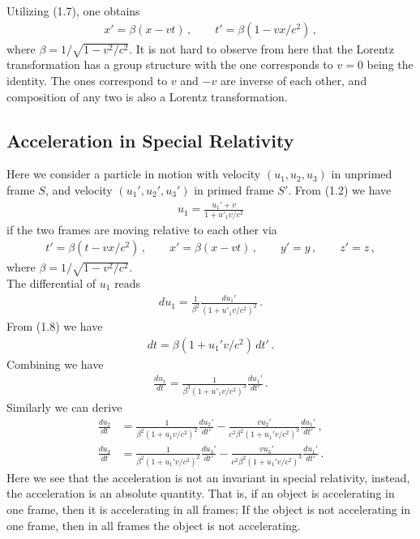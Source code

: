 \documentclass[11pt, onesided]{book}
\theoremstyle{break}
\theoremstyle{break}
\begin{document}
Utilizing (1.7), one obtains
\begin{align}
 x' = \beta (x - vt) \,,\qquad t' = \beta (1- vx/c^2)\,,
\end{align}
where $\beta = 1/\sqrt{1 - v^2 / c^2}$. It is not hard to observe from here that the Lorentz transformation has a group structure with the one corresponds to $v = 0$ being the identity. The ones correspond to $v$ and $-v$ are inverse of each other, and composition of any two is also a Lorentz transformation. \\

\subsection{Acceleration in Special Relativity}
Here we consider a particle in motion with velocity $(u_1,u_2,u_3)$ in unprimed frame $S$, and velocity $(u_1', u_2', u_3')$ in primed frame $S'$. From (1.2) we have
\begin{align*}
u_1 = \frac{u_1' + v}{1+ u'_1 v/c^2}
\end{align*}
if the two frames are moving relative to each other via
\begin{align*}
t' = \beta(t-vx/c^2)\,, \qquad x' = \beta (x- vt)\,, \qquad y'=y\,, \qquad z'=z\,,
\end{align*}
where $\beta = 1/\sqrt{1-v^2/c^2}$.\\

The differential of $u_1$ reads
\begin{align*}
du_1 = \frac{1}{\beta^2} \frac{du_1'}{(1+u'_1 v/c^2)^2}\,.
\end{align*}
From (1.8) we have
\begin{align*}
dt = \beta (1 + u_1'v/c^2)\, dt'\,.
\end{align*}
Combining we have
\begin{align*}
\frac{du_1}{dt} = \frac{1}{\beta^3(1+ u'_1 v/c^2)^3}\frac{du_1'}{dt'}\,.
\end{align*}
Similarly we can derive
\begin{align*}
\frac{du_2}{dt} &= \frac{1}{\beta^2(1+u_1v/c^2)^2} \frac{du_2'}{dt'} - \frac{vu_2'}{c^2 \beta^2 ( 1+ u_1'v/c^2)^3}\frac{du_1'}{dt'}\,,\\
\frac{du_3}{dt} &= \frac{1}{\beta^2(1+u_1'v/c^2)^2}\frac{du_3'}{dt'} - \frac{vu_3'}{c^2 \beta^2 (1+ u_1'v/c^2)^3}\frac{du_1'}{dt'}\,.
\end{align*}
Here we see that the acceleration is not an invariant in special relativity, instead, the acceleration is an absolute quantity. That is, if an object is accelerating in one frame, then it is accelerating in all frames; If the object is not accelerating in one frame, then in all frames the object is not accelerating. \\
\end{document}
